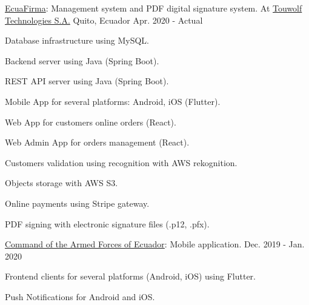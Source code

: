 
\begin{cventries}

  \cventry
    {\href{https://ecuafirma.com}{EcuaFirma}: Management system and PDF digital signature system.} %
    {At \href{https://touwolf.com/}{Touwolf Technologies S.A.}} %
    {Quito, Ecuador} %
    {Apr. 2020 - Actual} %
    {
      \begin{cvitems} %
        \item {Database infrastructure using MySQL.}
        \item {Backend server using Java (Spring Boot).}
        \item {REST API server using Java (Spring Boot).}
        \item {Mobile App for several platforms: Android, iOS (Flutter).}
        \item {Web App for customers online orders (React).}
        \item {Web Admin App for orders management (React).}
        \item {Customers validation using recognition with AWS rekognition.}
        \item {Objects storage with AWS S3.}
        \item {Online payments using Stripe gateway.}
        \item {PDF signing with electronic signature files (.p12, .pfx).}
      \end{cvitems}
    }

  \cventry
    {\href{https://www.ccffaa.mil.ec/}{Command of the Armed Forces of Ecuador}: Mobile application.} %
    {} %
    {} %
    {Dec. 2019 - Jan. 2020} %
    {
      \begin{cvitems} %
        \item {Frontend clients for several platforms (Android, iOS) using Flutter.}
        \item {Push Notifications for Android and iOS.}
      \end{cvitems}
    }


\end{cventries}
